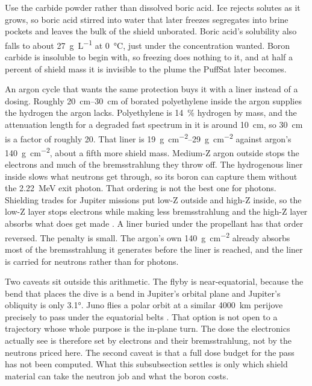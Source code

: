 \documentclass{article}
\begin{document}
Use the carbide powder rather than dissolved boric acid. Ice rejects solutes as it grows, so boric acid stirred into water that later freezes segregates into brine pockets and leaves the bulk of the shield unborated. Boric acid's solubility also falls to about \SI{27}{\gram\per\liter} at \SI{0}{\celsius}, just under the concentration wanted. Boron carbide is insoluble to begin with, so freezing does nothing to it, and at half a percent of shield mass it is invisible to the plume the PuffSat later becomes.

An argon cycle that wants the same protection buys it with a liner instead of a dosing. Roughly \SIrange{20}{30}{\centi\meter} of borated polyethylene inside the argon supplies the hydrogen the argon lacks. Polyethylene is \SI{14}{\percent} hydrogen by mass, and the attenuation length for a degraded fast spectrum in it is around \SI{10}{\centi\meter}, so \SI{30}{\centi\meter} is a factor of roughly 20. That liner is \SIrange{19}{29}{\gram\per\square\centi\meter} against argon's \SI{140}{\gram\per\square\centi\meter}, about a fifth more shield mass. Medium-Z argon outside stops the electrons and much of the bremsstrahlung they throw off. The hydrogenous liner inside slows what neutrons get through, so its boron can capture them without the \SI{2.22}{\mega\electronvolt} exit photon. That ordering is not the best one for photons. Shielding trades for Jupiter missions put low-Z outside and high-Z inside, so the low-Z layer stops electrons while making less bremsstrahlung and the high-Z layer absorbs what does get made \cite{cherng2007jovian_shielding}. A liner buried under the propellant has that order reversed. The penalty is small. The argon's own \SI{140}{\gram\per\square\centi\meter} already absorbs most of the bremsstrahlung it generates before the liner is reached, and the liner is carried for neutrons rather than for photons.

Two caveats sit outside this arithmetic. The flyby is near-equatorial, because the bend that places the dive is a bend in Jupiter's orbital plane and Jupiter's obliquity is only \ang{3.1}. Juno flies a polar orbit at a similar \SI{4000}{\kilo\meter} perijove precisely to pass under the equatorial belts \cite{bolton2017juno}. That option is not open to a trajectory whose whole purpose is the in-plane turn. The dose the electronics actually see is therefore set by electrons and their bremsstrahlung, not by the neutrons priced here. The second caveat is that a full dose budget for the pass has not been computed. What this subsubsection settles is only which shield material can take the neutron job and what the boron costs.
\end{document}

